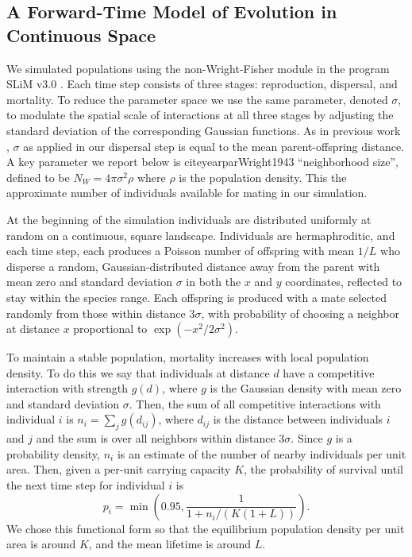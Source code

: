 \documentclass[11pt,twoside,lineno]{preprint}
\begin{document}
\subsection{A Forward-Time Model of Evolution in Continuous Space}

We simulated populations using the non-Wright-Fisher module in the program SLiM v3.0 \citep{Haller2019}. 
Each time step consists of three stages: reproduction, dispersal, and mortality. 
To reduce the parameter space we use the same parameter, denoted $\sigma$, 
to modulate the spatial scale of interactions at all three stages by adjusting the standard deviation of the corresponding Gaussian functions. 
As in previous work \citep{Wright1943,Ringbauer2017}, $\sigma$ as applied in our dispersal step is equal to the mean parent-offspring distance.  
A key parameter we report below is
\citeauthor{Wright1943} citeyearpar{Wright1943} ``neighborhood size'', 
defined to be $N_W = 4\pi\sigma^2 \rho$ where $\rho$ is the population density.
This the approximate number of individuals available for mating in our simulation. 

At the beginning of the simulation individuals are distributed uniformly at random on a continuous, square landscape. 
Individuals are hermaphroditic, and each time step, each produces a Poisson number of offspring with mean $1/L$ 
who disperse a random, Gaussian-distributed distance away from the parent with mean zero and standard deviation $\sigma$
in both the $x$ and $y$ coordinates, reflected to stay within the species range.
Each offspring is produced with a mate selected randomly from those within distance $3 \sigma$,
with probability of choosing a neighbor at distance $x$ proportional to $\exp(-x^2 / 2 \sigma^2)$.

To maintain a stable population, mortality increases with local population density.
To do this we say that individuals at distance $d$ have a competitive interaction with strength $g(d)$,
where $g$ is the Gaussian density with mean zero and standard deviation $\sigma$.
Then, the sum of all competitive interactions with individual $i$ is $n_i = \sum_j g(d_{ij})$,
where $d_{ij}$ is the distance between individuals $i$ and $j$ and the sum is over all neighbors within distance $3 \sigma$.
Since $g$ is a probability density, $n_i$ is an estimate of the number of nearby individuals per unit area.
Then, given a per-unit carrying capacity $K$, the probability of survival until the next time step for individual $i$ is
\begin{equation}
    p_i 
    =
    \min\left( 0.95, \frac{1}{1 + n_i / (K (1+L))} \right) .
\end{equation}
We chose this functional form so that the equilibrium population density per unit area is around $K$,
and the mean lifetime is around $L$.
\end{document}
